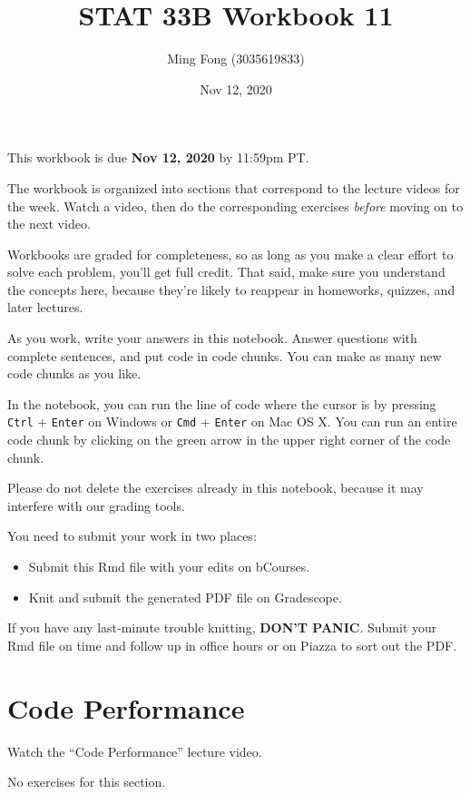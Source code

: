 \documentclass[
]{article}
\title{STAT 33B Workbook 11}
\author{Ming Fong (3035619833)}
\date{Nov 12, 2020}
\providecommand{\tightlist}{%
  \setlength{\itemsep}{0pt}\setlength{\parskip}{0pt}}
\begin{document}
\maketitle

This workbook is due \textbf{Nov 12, 2020} by 11:59pm PT.

The workbook is organized into sections that correspond to the lecture
videos for the week. Watch a video, then do the corresponding exercises
\emph{before} moving on to the next video.

Workbooks are graded for completeness, so as long as you make a clear
effort to solve each problem, you'll get full credit. That said, make
sure you understand the concepts here, because they're likely to
reappear in homeworks, quizzes, and later lectures.

As you work, write your answers in this notebook. Answer questions with
complete sentences, and put code in code chunks. You can make as many
new code chunks as you like.

In the notebook, you can run the line of code where the cursor is by
pressing \texttt{Ctrl} + \texttt{Enter} on Windows or \texttt{Cmd} +
\texttt{Enter} on Mac OS X. You can run an entire code chunk by clicking
on the green arrow in the upper right corner of the code chunk.

Please do not delete the exercises already in this notebook, because it
may interfere with our grading tools.

You need to submit your work in two places:

\begin{itemize}
\tightlist
\item
  Submit this Rmd file with your edits on bCourses.
\item
  Knit and submit the generated PDF file on Gradescope.
\end{itemize}

If you have any last-minute trouble knitting, \textbf{DON'T PANIC}.
Submit your Rmd file on time and follow up in office hours or on Piazza
to sort out the PDF.

\hypertarget{code-performance}{%
\section{Code Performance}\label{code-performance}}

Watch the ``Code Performance'' lecture video.

No exercises for this section.
\end{document}
